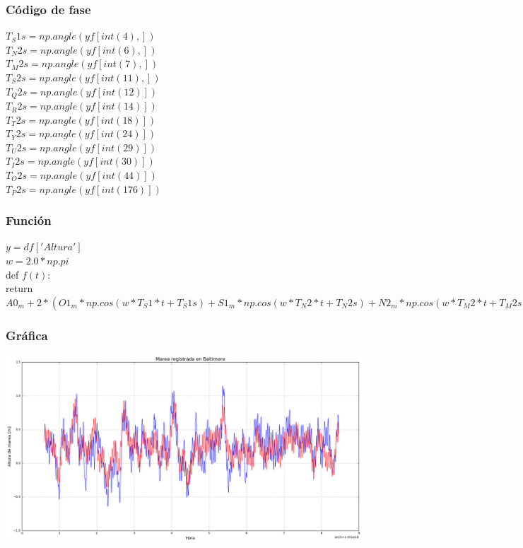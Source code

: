 \documentclass[a4paper,12pt]{article}
\begin{document}
\subsubsection{Código de fase}
\noindent
$T_S1s =np.angle(yf[int(4),])$\\
$T_N2s =np.angle(yf[int(6),])$\\
$T_M2s =np.angle(yf[int(7),])$\\
$T_S2s=np.angle(yf[int(11),])$\\
$T_Q2s = np.angle(yf[int(12)])$\\
$T_R2s =np.angle(yf[int(14)])$\\
$T_T2s =np.angle(yf[int(18)])$\\
$T_Y2s =np.angle(yf[int(24)])$\\
$T_U2s =np.angle(yf[int(29)])$\\
$T_I2s =np.angle(yf[int(30)])$\\
$T_O2s =np.angle(yf[int(44)])$\\
$T_P2s =np.angle(yf[int(176)])$\\

\subsubsection{Función}
\noindent
$y= df['Altura']$\\
$w= 2.0*np.pi$\\

def $f(t):$\\
    return $ A0_m + 2*(O1_m*np.cos(w *T_S1*t+T_S1s) + S1_m*np.cos(w*T_N2*t+T_N2s)
+ N2_m*np.cos(w*T_M2*t+T_M2s) +M2_m*np.cos(w*T_S2*t+T_S2s) +Q2_m*np.cos(w*T_Q2*t+T_Q2s)               +F2_m*np.cos(w*T_R2*t+T_R2s) +S2_m*np.cos(w*T_T2*t+T_T2s)+D2_m*np.cos(w*T_Y2*t+T_Y2s)                +G2_m*np.cos(w*T_U2*t+T_U2s)+H2_m*np.cos(w*T_I2*t+T_I2s)+J2_m*np.cos(w*T_O2*t+T_O2s)                   +K2_m*np.cos(w*T_P2*t+T_P2s))$

\subsubsection{Gráfica}

\begin{center}
\includegraphics[scale=0.4]{graficabalti7.png}
\end{center}
\end{document}
